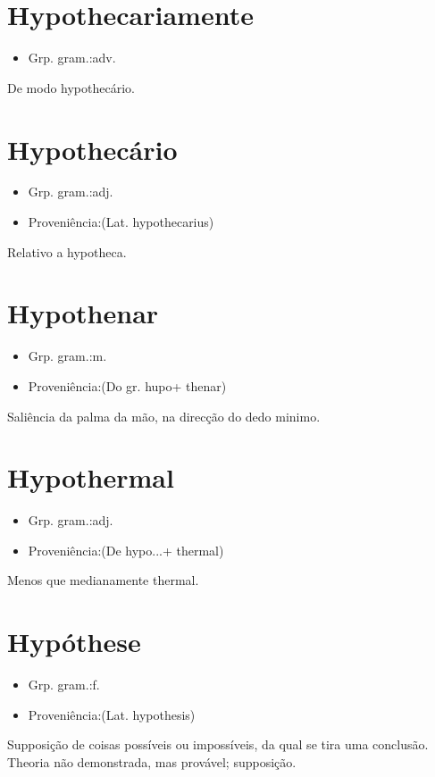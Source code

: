 \documentclass{article}
\begin{document}
\section{Hypothecariamente}
\begin{itemize}
\item {Grp. gram.:adv.}
\end{itemize}
De modo hypothecário.
\section{Hypothecário}
\begin{itemize}
\item {Grp. gram.:adj.}
\end{itemize}
\begin{itemize}
\item {Proveniência:(Lat. \textunderscore hypothecarius\textunderscore )}
\end{itemize}
Relativo a hypotheca.
\section{Hypothenar}
\begin{itemize}
\item {Grp. gram.:m.}
\end{itemize}
\begin{itemize}
\item {Proveniência:(Do gr. \textunderscore hupo\textunderscore  + \textunderscore thenar\textunderscore )}
\end{itemize}
Saliência da palma da mão, na direcção do dedo minimo.
\section{Hypothermal}
\begin{itemize}
\item {Grp. gram.:adj.}
\end{itemize}
\begin{itemize}
\item {Proveniência:(De \textunderscore hypo...\textunderscore  + \textunderscore thermal\textunderscore )}
\end{itemize}
Menos que medianamente thermal.
\section{Hypóthese}
\begin{itemize}
\item {Grp. gram.:f.}
\end{itemize}
\begin{itemize}
\item {Proveniência:(Lat. \textunderscore hypothesis\textunderscore )}
\end{itemize}
Supposição de coisas possíveis ou impossíveis, da qual se tira uma conclusão.
Theoria não demonstrada, mas provável; supposição.
\end{document}
